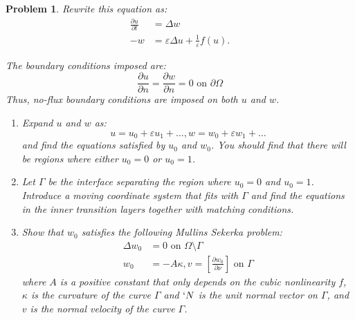 \documentclass[a4paper]{article}
\newtheorem*{problem}{Problem}
\begin{document}
\begin{enumerate}
\begin{problem}
      Rewrite this equation as:
      \begin{align}
        \frac{\partial u}{\partial t} &= \Delta w \label{eqn:prob3_3} \\
        -w &= \varepsilon \Delta u + \frac{1}{\varepsilon} f(u).
        \label{eqn:prob3_4}
      \end{align}

      The boundary conditions imposed are:
      \begin{equation}
        \frac{\partial u}{\partial n} = \frac{\partial w}{\partial n} = 0 \text{ on } \partial \Omega
        \label{eqn:prob3_5}
      \end{equation}
      Thus, no-flux boundary conditions are imposed on both $u$ and $w$.

      \begin{enumerate}
        \item Expand $u$ and $w$ as:
          \begin{equation}
            u = u_0 + \varepsilon u_1 + \dots, w = w_0 + \varepsilon w_1 + \dots
            \label{eqn:prob3_6}
          \end{equation}
          and find the equations satisfied by $u_0$ and $w_0$. You should find that there will be regions where either $u_0 = 0$ or $u_0 = 1$.

        \item
          Let $\Gamma$ be the interface separating the region where $u_0 = 0$ and $u_0 = 1$. Introduce a moving coordinate system that fits with
          $\Gamma$ and find the equations in the inner transition layers together with matching conditions.

        \item
          Show that $w_0$ satisfies the following \textit{Mullins Sekerka} problem:
          \begin{align}
            \Delta w_0 &= 0 \text{ on } \Omega \setminus \Gamma \label{eqn:prob3_7} \\
            w_0 &= -A \kappa, v = \left[ \frac{\partial w_0}{\partial \nu} \right] \text{ on } \Gamma
            \label{eqn:prob3_8}
          \end{align}
          where $A$ is a positive constant that only depends on the cubic nonlinearity $f$, $\kappa$ is the curvature of the curve $\Gamma$ and $`N$
          is the unit normal vector on $\Gamma$, and $v$ is the normal velocity of the curve $\Gamma$.

      \end{enumerate}


\end{problem}
\end{enumerate}
\end{document}
